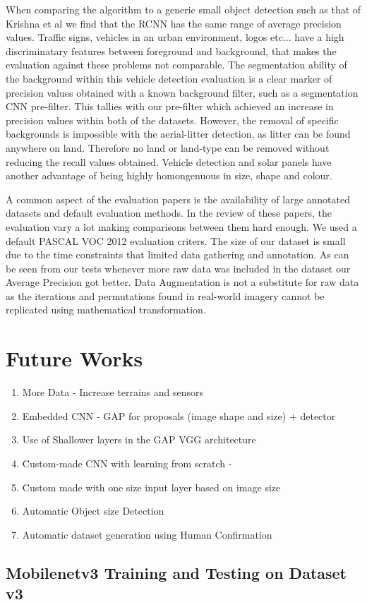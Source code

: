 \documentclass{IEEEtran}
\begin{document}
When comparing the algorithm to a generic small object detection such as that of Krishna et al \cite{Krishna} we find that the RCNN has the same range of average precision values. Traffic signs, vehicles in an urban environment, logos etc... have a high discriminatary features between foreground and background, that makes the evaluation against these problems not comparable. The segmentation ability of the background within this vehicle detection evaluation is a clear marker of precision values obtained with a known background filter, such as a segmentation CNN pre-filter. This tallies with our pre-filter which achieved an increase in precision values within both of the datasets. However, the removal of specific backgrounds is impossible with the aerial-litter detection, as litter can be found anywhere on land. Therefore no land or land-type can be removed without reducing the recall values obtained. Vehicle detection and solar panels have another advantage of being highly homongenuous in size, shape and colour.\newline

A common aspect of the evaluation papers is the availability of large annotated datasets and default evaluation methods. In the review of these papers, the evaluation vary a lot making comparisons between them hard enough. We used a default PASCAL VOC 2012 evaluation criters. The size of our dataset is small due to the time constraints that limited data gathering and annotation. As can be seen from our tests whenever more raw data was included in the dataset our Average Precision got better. Data Augmentation is not a substitute for raw data as the iterations and permutations found in real-world imagery cannot be replicated using mathematical transformation. \newline

\section{Future Works}

\begin{enumerate}
\item More Data - Increase terrains and sensors
\item Embedded CNN - GAP for proposals (image shape and size) + detector
\item Use of Shallower layers in the GAP VGG architecture
\item Custom-made CNN with learning from scratch - 
\item Custom made with one size input layer based on image size
\item Automatic Object size Detection
\item Automatic dataset generation using Human Confirmation
\end{enumerate}

\appendix

\subsection{Mobilenetv3 Training and Testing on Dataset v3}
\label{mobilenet}




\end{document}
